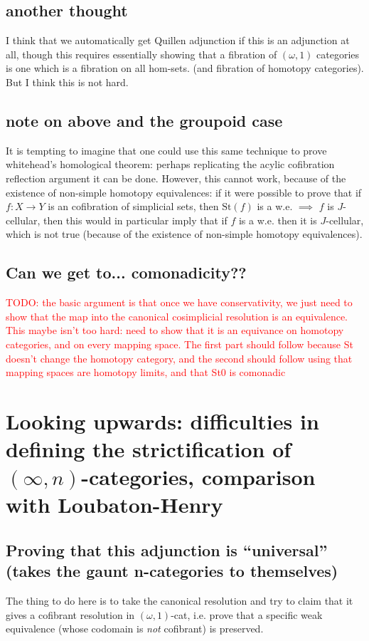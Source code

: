 \documentclass[12pt]{article}
\theoremstyle{definition}
\newcommand{\TODO}[1]{\textcolor{red}{TODO: {#1}}}
\newcommand{\st}{\text{St}}
\begin{document}
\subsection{another thought}
I think that we automatically get Quillen adjunction if this is an adjunction at all, though this requires essentially showing that a fibration of $(\omega,1)$ categories is one which is a fibration on all hom-sets. (and fibration of homotopy categories). But I think this is not hard.

\subsection{note on above and the groupoid case}
	It is tempting to imagine that one could use this same technique to prove whitehead's homological theorem: perhaps replicating the acylic cofibration reflection argument it can be done. However, this cannot work, because of the existence of non-simple homotopy equivalences: if it were possible to prove that if $f: X \to Y$ is an cofibration of simplicial sets, then $\st(f)$ is a w.e. $\implies$ $f$ is $J$-cellular, then this would in particular imply that if $f$ is a w.e. then it is $J$-cellular, which is not true (because of the existence of non-simple homotopy equivalences).
	
\subsection{Can we get to... comonadicity??}
	\TODO{the basic argument is that once we have conservativity, we just need to show that the map into the canonical cosimplicial resolution is an equivalence. This maybe isn't too hard: need to show that it is an equivance on homotopy categories, and on every mapping space. The first part should follow because St doesn't change the homotopy category, and the second should follow using that mapping spaces are homotopy limits, and that St0 is comonadic}

\section{Looking upwards: difficulties in defining the strictification of $(\infty,n)$-categories, comparison with Loubaton-Henry}

\subsection{Proving that this adjunction is ``universal'' (takes the gaunt n-categories to themselves)}
	The thing to do here is to take the canonical resolution and try to claim that it gives a cofibrant resolution in $(\omega,1)$-cat, i.e. prove that a specific weak equivalence (whose codomain is \textit{not} cofibrant) is preserved. 
\end{document}
